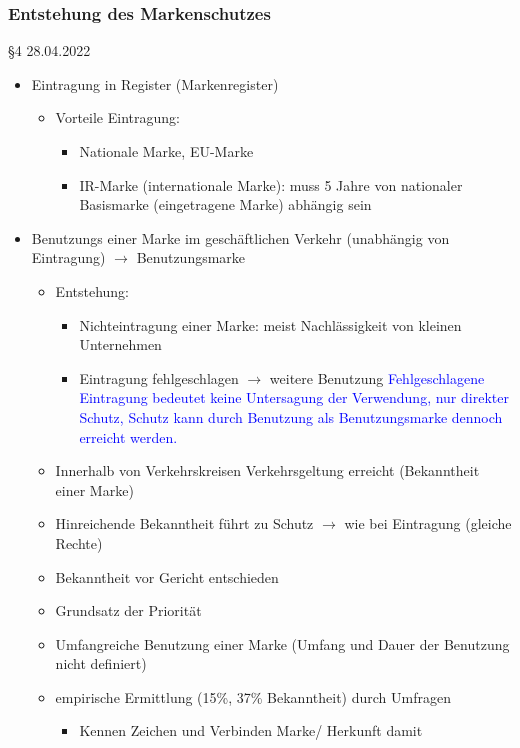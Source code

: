 \documentclass{report}
\begin{document}
\subsubsection{Entstehung des Markenschutzes} §4
28.04.2022
\begin{itemize}
	\item Eintragung in Register (Markenregister)
	\begin{itemize}
		\item Vorteile Eintragung:
		\begin{itemize}
			\item Nationale Marke, EU-Marke
			\item IR-Marke (internationale Marke): muss 5 Jahre von nationaler Basismarke (eingetragene Marke) abhängig sein
		\end{itemize}
	\end{itemize}
	\item Benutzungs einer Marke im geschäftlichen Verkehr (unabhängig von Eintragung)
	\newline $\rightarrow$ Benutzungsmarke
	\begin{itemize}
		\item Entstehung:
		\begin{itemize}
			\item Nichteintragung einer Marke: meist Nachlässigkeit von kleinen Unternehmen
			\item Eintragung fehlgeschlagen $\rightarrow$ weitere Benutzung
			\newline \textcolor{blue}{Fehlgeschlagene Eintragung bedeutet keine Untersagung der Verwendung, nur direkter Schutz, Schutz kann durch Benutzung als Benutzungsmarke dennoch erreicht werden.}
		\end{itemize}
		\item Innerhalb von Verkehrskreisen Verkehrsgeltung erreicht (Bekanntheit einer Marke)
		\item Hinreichende Bekanntheit führt zu Schutz $\rightarrow$ wie bei Eintragung (gleiche Rechte)
		\item Bekanntheit vor Gericht entschieden
		\item Grundsatz der Priorität
		\item Umfangreiche Benutzung einer Marke (Umfang und Dauer der Benutzung nicht definiert)
		\item empirische Ermittlung (15\%, 37\% Bekanntheit) durch Umfragen
		\begin{itemize}
			\item Kennen Zeichen und Verbinden Marke/ Herkunft damit

\end{itemize}
\end{itemize}
\end{itemize}
\end{document}
